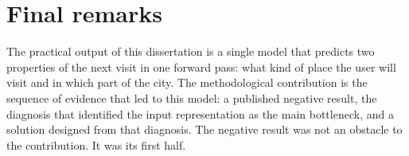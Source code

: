 \section{Final remarks}
\label{sec:conc:final}

The practical output of this dissertation is a single model that predicts two
properties of the next visit in one forward pass: what kind of place the user will
visit and in which part of the city. The methodological contribution is the sequence
of evidence that led to this model: a published negative result, the diagnosis that
identified the input representation as the main bottleneck, and a solution designed
from that diagnosis. The negative result was not an obstacle to the contribution. It
was its first half.
